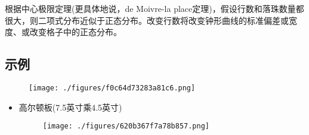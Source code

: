 根据中心极限定理(更具体地说，de Moivre-la place定理)，假设行数和落珠数量都很大，则二项式分布近似于正态分布。改变行数将改变钟形曲线的标准偏差或宽度、或改变格子中的正态分布。

\subsection{示例}

\begin{figure}[ht]
\centering
\texttt{[image: ./figures/f0c64d73283a81c6.png]}
\caption\label{fig_GRDDB_2}
\end{figure}

\begin{itemize}
\item 高尔顿板(7.5英寸乘4.5英寸)
\begin{figure}[ht]
\centering
\texttt{[image: ./figures/620b367f7a78b857.png]}
\caption \label{fig_GRDDB_3}
\it
\end{figure}

\end{itemize}
